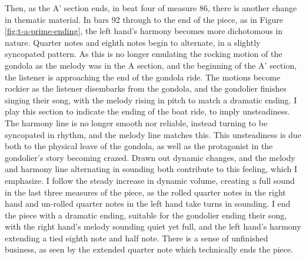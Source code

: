 Then, as the A' section ends, in beat four of measure 86, there is another change in thematic material. In bars 92 through to the end of the piece, as in Figure \ref{fig:t-a-prime-ending}\autocite{Henle_2002}, the left hand's harmony becomes more dichotomous in nature. Quarter notes and eighth notes begin to alternate, in a slightly syncopated pattern. As this is no longer emulating the rocking motion of the gondola as the melody was in the A section, and the beginning of the A' section, the listener is approaching the end of the gondola ride. The motions become rockier as the listener disembarks from the gondola, and the gondolier finishes singing their song, with the melody rising in pitch to match a dramatic ending. I play this section to indicate the ending of the boat ride, to imply unsteadiness. The harmony line is no longer smooth nor reliable, instead turning to be syncopated in rhythm, and the melody line matches this. This unsteadiness is due both to the physical leave of the gondola, as well as the protagonist in the gondolier's story becoming crazed. Drawn out dynamic changes, and the melody and harmony line alternating in sounding both contribute to this feeling, which I emphasize. I follow the steady increase in dynamic volume, creating a full sound in the last three measures of the piece, as the rolled quarter notes in the right hand and un-rolled quarter notes in the left hand take turns in sounding. I end the piece with a dramatic ending, suitable for the gondolier ending their song, with the right hand's melody sounding quiet yet full, and the left hand's harmony extending a tied eighth note and half note. There is a sense of unfinished business, as seen by the extended quarter note which technically ends the piece. 
